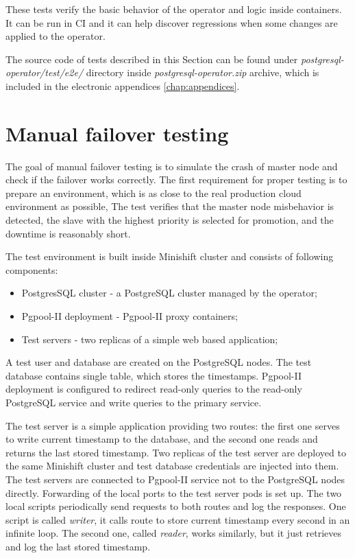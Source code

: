 \documentclass[
  digital, %
  twoside, %
  table,   %
  lof,     %
  lot,     %
]{fithesis3}
\begin{document}
These tests verify the basic behavior of the operator and logic inside containers. It can be run in CI and it can help discover regressions when some changes are applied to the operator.

The source code of tests described in this Section can be found under \textit{postgresql-operator/test/e2e/} directory inside \textit{postgresql-operator.zip} archive, which is included in the electronic appendices \ref{chap:appendices}.

\section{Manual failover testing}
The goal of manual failover testing is to simulate the crash of master node and check if the failover works correctly. The first requirement for proper testing is to prepare an environment, which is as close to the real production cloud environment as possible, The test verifies that the master node misbehavior is detected, the slave with the highest priority is selected for promotion, and the downtime is reasonably short.

The test environment is built inside Minishift cluster and consists of following components:
\begin{itemize}
  \item PostgresSQL cluster - a PostgreSQL cluster managed by the operator;
  \item Pgpool-II deployment - Pgpool-II proxy containers;
  \item Test servers - two replicas of a simple web based application;
\end{itemize}

A test user and database are created on the PostgreSQL nodes. The test database contains single table, which stores the timestamps. Pgpool-II deployment is configured to redirect read-only queries to the read-only PostgreSQL service and write queries to the primary service.

The test server is a simple application providing two routes: the first one serves to write current timestamp to the database, and the second one reads and returns the last stored timestamp. Two replicas of the test server are deployed to the same Minishift cluster and test database credentials are injected into them. The test servers are connected to Pgpool-II service not to the PostgreSQL nodes directly. Forwarding of the local ports to the test server pods is set up. The two local scripts periodically send requests to both routes and log the responses. One script is called \textit{writer}, it calls route to store current timestamp every second in an infinite loop. The second one, called \textit{reader}, works similarly, but it just retrieves and log the last stored timestamp.
\end{document}
